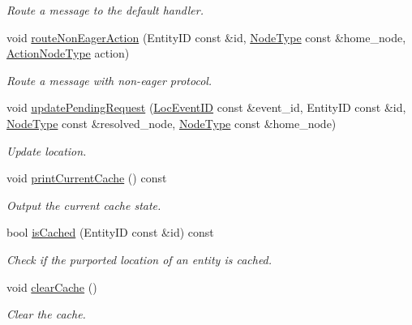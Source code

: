 \begin{DoxyCompactItemize}
\begin{DoxyCompactList}\small\item\em Route a message to the default handler. \end{DoxyCompactList}\item 
void \hyperlink{structvt_1_1location_1_1_entity_location_coord_ae7c1ec3412f2a16ea3f40d6bb39f23ca}{route\+Non\+Eager\+Action} (Entity\+ID const \&id, \hyperlink{namespacevt_a866da9d0efc19c0a1ce79e9e492f47e2}{Node\+Type} const \&home\+\_\+node, \hyperlink{namespacevt_a0436cb2d620dcbb21b5b49cd9c9c4749}{Action\+Node\+Type} action)
\begin{DoxyCompactList}\small\item\em Route a message with non-\/eager protocol. \end{DoxyCompactList}\item 
void \hyperlink{structvt_1_1location_1_1_entity_location_coord_a96e4c5c2a943450554b17c34f05995d0}{update\+Pending\+Request} (\hyperlink{namespacevt_1_1location_aa5ccc1a42aa22b0b41fcfbbdee314dca}{Loc\+Event\+ID} const \&event\+\_\+id, Entity\+ID const \&id, \hyperlink{namespacevt_a866da9d0efc19c0a1ce79e9e492f47e2}{Node\+Type} const \&resolved\+\_\+node, \hyperlink{namespacevt_a866da9d0efc19c0a1ce79e9e492f47e2}{Node\+Type} const \&home\+\_\+node)
\begin{DoxyCompactList}\small\item\em Update location. \end{DoxyCompactList}\item 
void \hyperlink{structvt_1_1location_1_1_entity_location_coord_a33f2bf9523cfc89fae0f1151fa2d87db}{print\+Current\+Cache} () const
\begin{DoxyCompactList}\small\item\em Output the current cache state. \end{DoxyCompactList}\item 
bool \hyperlink{structvt_1_1location_1_1_entity_location_coord_a9e6d5b9783f617f4e036ad9f7ba19953}{is\+Cached} (Entity\+ID const \&id) const
\begin{DoxyCompactList}\small\item\em Check if the purported location of an entity is cached. \end{DoxyCompactList}\item 
void \hyperlink{structvt_1_1location_1_1_entity_location_coord_ac20c510b73a5f6f753269b6d05b389aa}{clear\+Cache} ()
\begin{DoxyCompactList}\small\item\em Clear the cache. \end{DoxyCompactList}\item 

\end{DoxyCompactItemize}
